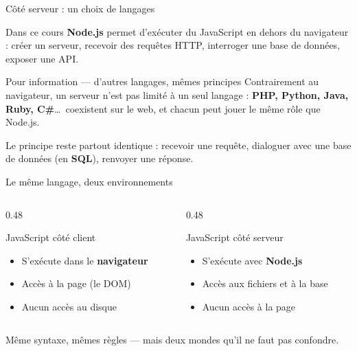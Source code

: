 \documentclass[aspectratio=169,11pt]{beamer}
\begin{document}
\begin{frame}{Côté serveur : un choix de langages}
  \begin{block}{Dans ce cours}
    \textbf{Node.js} permet d'exécuter du JavaScript en dehors du navigateur : créer un serveur, recevoir des requêtes HTTP, interroger une base de données, exposer une API.
  \end{block}
  \begin{exampleblock}{Pour information --- d'autres langages, mêmes principes}
    Contrairement au navigateur, un serveur n'est pas limité à un seul langage : \textbf{PHP, Python, Java, Ruby, C\#}\ldots\ coexistent sur le web, et chacun peut jouer le même rôle que Node.js.
    \vspace{0.2cm}

    Le principe reste partout identique : recevoir une requête, dialoguer avec une base de données (en \textbf{SQL}), renvoyer une réponse.
  \end{exampleblock}
\end{frame}

\begin{frame}{Le même langage, deux environnements}
  \begin{columns}[T]
    \begin{column}{0.48\textwidth}
      \begin{block}{JavaScript côté client}
        \begin{itemize}
          \item S'exécute dans le \textbf{navigateur}
          \item Accès à la page (le DOM)
          \item Aucun accès au disque
        \end{itemize}
      \end{block}
    \end{column}
    \begin{column}{0.48\textwidth}
      \begin{exampleblock}{JavaScript côté serveur}
        \begin{itemize}
          \item S'exécute avec \textbf{Node.js}
          \item Accès aux fichiers et à la base
          \item Aucun accès à la page
        \end{itemize}
      \end{exampleblock}
    \end{column}
  \end{columns}
  \vspace{0.4cm}
  \begin{center}
    \small Même syntaxe, mêmes règles --- mais deux mondes qu'il ne faut pas confondre.
  \end{center}
\end{frame}
\end{document}

